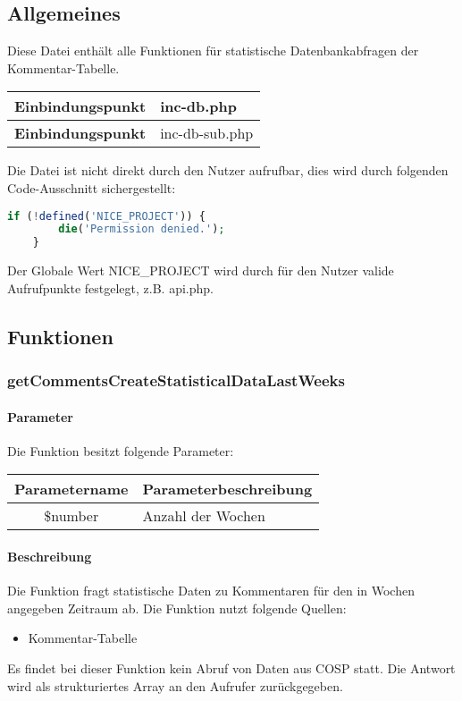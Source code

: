 \subsection{Allgemeines} Diese Datei enthält alle Funktionen für statistische Datenbankabfragen der Kommentar-Tabelle.
\begin{table}[H]
	\begin{tabular}{|c|p{11cm}|}
		\hline
		\textbf{Einbindungspunkt} & inc-db.php \\ \hline
		\textbf{Einbindungspunkt} & inc-db-sub.php \\ \hline
	\end{tabular}
\end{table}
Die Datei ist nicht direkt durch den Nutzer aufrufbar, dies wird durch folgenden Code-Ausschnitt sichergestellt:
\begin{lstlisting}[language=php]
	if (!defined('NICE_PROJECT')) {
		die('Permission denied.');
	}
\end{lstlisting}
Der Globale Wert {\glqq NICE\_PROJECT\grqq} wird durch für den Nutzer valide Aufrufpunkte festgelegt, z.B. {\glqq api.php\grqq}.
\newpage
\subsection{Funktionen}
\subsubsection{getCommentsCreateStatisticalDataLastWeeks}
\paragraph{Parameter} Die Funktion besitzt folgende Parameter:
\begin{table}[H]
	\begin{tabular}{|c|p{11cm}|}
		\hline
		\textbf{Parametername} & \textbf{Parameterbeschreibung} \\ \hline
		\$number & Anzahl der Wochen \\ \hline
	\end{tabular}
\end{table}
\paragraph{Beschreibung} Die Funktion fragt statistische Daten zu Kommentaren für den in Wochen angegeben Zeitraum ab. Die Funktion nutzt folgende Quellen:
\begin{itemize}
	\item Kommentar-Tabelle
\end{itemize}
Es findet bei dieser Funktion kein Abruf von Daten aus {\glqq COSP\grqq} statt. Die Antwort wird als strukturiertes Array an den Aufrufer zurückgegeben.
